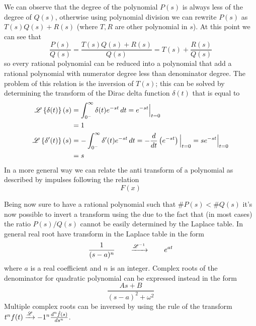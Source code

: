 	We can observe that the degree of the polynomial $P(s)$ is always less of the degree of $Q(s)$, otherwise using polynomial division we can rewrite $P(s)$ as $T(s)Q(s) + R(s)$ (where $T,R$ are other polynomial in $s$). At this point we can see that
	\[ \frac{P(s)}{Q(s)} = \frac{T(s)Q(s) + R(s)}{Q(s)} = T(s) + \frac{R(s)}{Q(s)} \]
	so every rational polynomial can be reduced into a polynomial that add a rational polynomial with numerator degree less than denominator degree. The problem of this relation is the inversion of $T(s)$; this can be solved by determining the transform of the Dirac delta function $\delta(t)$ that is equal to
	\begin{equation}
	\begin{split}
		\mathscr{L} \left\{ \delta(t) \right\}(s) & = \int_{0^-}^\infty \delta(t) e^{-st}\, dt = e^{-st} \Big|_{t=0} \\ & = 1 \\
		\mathscr{L} \left\{ \delta'(t) \right\}(s) & = -\int_{0^-}^\infty \delta'(t) e^{-st} \, dt = - \frac d {dt} \left(e^{-st}\right) \Big|_{t=0} = s e^ {-st} \Big|_{t=0} \\ & = s
	\end{split}
	\end{equation}
	In a more general way we can relate the anti transform of a polynomial as described by impulses following the relation
	\begin{equation}
		F(x)
	\end{equation}
		
	\vspace{3mm}
	Being now sure to have a rational polynomial such that $\#P(s) < \#Q(s)$ it's now possible to invert a transform using the  due to the fact that (in most cases) the ratio $P(s)/Q(s)$ cannot be easily determined by the Laplace table. In general real root have transform in the Laplace table 	in the form
	\[  \frac 1 {(s-a)^n} \qquad \xrightarrow{\mathscr{L}^{-1}} \qquad e^{at}\]
	where $a$ is a real coefficient and $n$ is an integer. Complex roots of the denominator for quadratic polynomial can be expressed instead in the form
	\[ \frac{As+B}{(s-a)^2 + \omega^2} \]
	Multiple complex roots can be inversed by using the rule of the transform $t^n f(t) \xrightarrow{\mathscr{L}} -1^n \frac{d^n \hat f(s)}{ds^n}$.
		
		
		
		
		
		
		
		
		
		
		
		
		
		
		
		
		